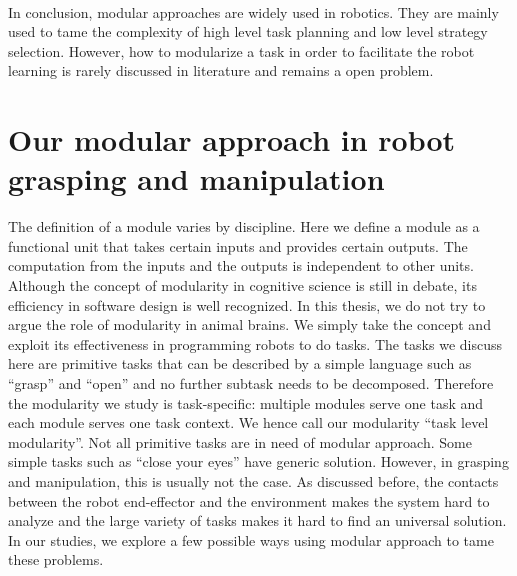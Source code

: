 ~\\
In conclusion, modular approaches are widely used in robotics. They are mainly used to tame the complexity of high level task planning and low level strategy selection. However, how to modularize a task in order to facilitate the robot learning is rarely discussed in literature and remains a open problem.






\section{Our modular approach in robot grasping and manipulation}
\label{cha1:contribution}
The definition of a module varies by discipline. Here we define a module as a functional unit that takes certain inputs and provides certain outputs. The computation from the inputs and the outputs is independent to other units. Although the concept of modularity in cognitive science is still in debate, its efficiency in software design is well recognized. In this thesis, we do not try to argue the role of modularity in animal brains. We simply take the concept and exploit its effectiveness in programming robots to do tasks. The tasks we discuss here are primitive tasks that can be described by a simple language such as ``grasp'' and ``open'' and no further subtask needs to be decomposed. Therefore the modularity we study is task-specific: multiple modules serve one task and each module serves one task context. We hence call our modularity ``task level modularity''. Not all primitive tasks are in need of modular approach. Some simple tasks such as ``close your eyes'' have generic solution. However, in grasping and manipulation, this is usually not the case. As discussed before, the contacts between the robot end-effector and the environment makes the system hard to analyze and the large variety of tasks makes it hard to find an universal solution. In our studies, we explore a few possible ways using modular approach to tame these problems.


